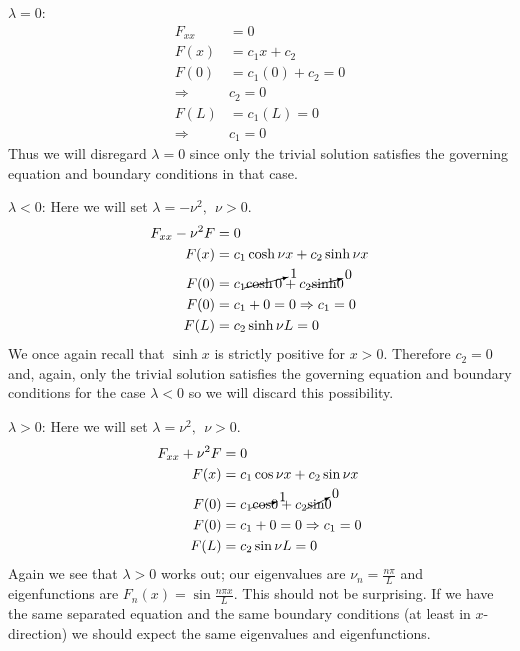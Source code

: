 \vspace{0.25cm}

\noindent\underline{$\lambda = 0$}:
\begin{align*}
F_{xx} &= 0 \\
F(x) &= c_1x + c_2 \\
F(0) &= c_1(0) + c_2 = 0 \\
\Rightarrow & c_2 = 0 \\
F(L) &= c_1(L) = 0 \\
\Rightarrow & c_1 = 0
\end{align*}
Thus we will disregard $\lambda = 0$ since only the trivial solution satisfies the governing equation and boundary conditions in that case.

\vspace{0.25cm}

\noindent\underline{$\lambda < 0$}:  Here we will set $\lambda = -\nu^2, \ \ \nu>0$. 
\begin{align*}
F_{xx} - \nu^2 F &= 0 \\
F(x) &= c_1 \cosh{\nu x} + c_2 \sinh{\nu x} \\
F(0) &= c_1 \cancelto{1}{\cosh{0}} + c_2 \cancelto{0}\sinh{0} \\
F(0) &= c_1 + 0 = 0 \Rightarrow c_1 = 0 \\
F(L) &= c_2 \sinh{\nu L} = 0 \\
\end{align*}
We once again recall that $\sinh{x}$ is strictly positive for $x>0$.  Therefore $c_2 = 0$ and, again, only the trivial solution satisfies the governing equation and boundary conditions for the case $\lambda < 0$ so we will discard this possibility.

\vspace{0.25cm}

\noindent\underline{$\lambda > 0$}:  Here we will set $\lambda = \nu^2, \ \ \nu>0$.
\begin{align*}
F_{xx} + \nu^2 F &= 0 \\
F(x) &= c_1 \cos{\nu x} + c_2 \sin{\nu x} \\
F(0) &= c_1 \cancelto{1}\cos{0} + c_2 \cancelto{0}\sin{0} \\
F(0) &= c_1 + 0 = 0 \Rightarrow c_1 = 0 \\
F(L) &= c_2 \sin{\nu L} = 0
\end{align*}
Again we see that $\lambda > 0$ works out; our eigenvalues are $\nu_n = \frac{n \pi}{L}$ and eigenfunctions are $F_n(x) = \sin{\frac{n \pi x}{L}}$.  This should not be surprising.  If we have the same separated equation and the same boundary conditions (at least in $x$-direction) we should expect the same eigenvalues and eigenfunctions.

